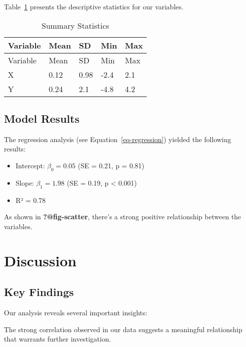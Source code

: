 \documentclass[
  11pt,
]{article}
\providecommand{\tightlist}{%
  \setlength{\itemsep}{0pt}\setlength{\parskip}{0pt}}
\begin{document}
Table~\ref{tbl-summary} presents the descriptive statistics for our
variables.

\begin{longtable}[]{@{}lllll@{}}
\caption{Summary Statistics}\label{tbl-summary}\tabularnewline
\toprule\noalign{}
Variable & Mean & SD & Min & Max \\
\midrule\noalign{}
\endfirsthead
\toprule\noalign{}
Variable & Mean & SD & Min & Max \\
\midrule\noalign{}
\endhead
\bottomrule\noalign{}
\endlastfoot
X & 0.12 & 0.98 & -2.4 & 2.1 \\
Y & 0.24 & 2.1 & -4.8 & 4.2 \\
\end{longtable}

\subsection{Model Results}\label{model-results}

The regression analysis (see Equation~\ref{eq-regression}) yielded the
following results:

\begin{itemize}
\tightlist
\item
  Intercept: \(\beta_0 = 0.05\) (SE = 0.21, p = 0.81)
\item
  Slope: \(\beta_1 = 1.98\) (SE = 0.19, p \textless{} 0.001)
\item
  R² = 0.78
\end{itemize}

As shown in \textbf{?@fig-scatter}, there's a strong positive
relationship between the variables.

\section{Discussion}\label{sec-discussion}

\subsection{Key Findings}\label{key-findings}

Our analysis reveals several important insights:

\begin{tcolorbox}[enhanced jigsaw, bottomtitle=1mm, colframe=quarto-callout-note-color-frame, opacityback=0, leftrule=.75mm, opacitybacktitle=0.6, bottomrule=.15mm, colback=white, toptitle=1mm, colbacktitle=quarto-callout-note-color!10!white, breakable, coltitle=black, left=2mm, title=\textcolor{quarto-callout-note-color}{\faInfo}\hspace{0.5em}{Important Note}, arc=.35mm, toprule=.15mm, rightrule=.15mm, titlerule=0mm]

The strong correlation observed in our data suggests a meaningful
relationship that warrants further investigation.

\end{tcolorbox}
\end{document}
